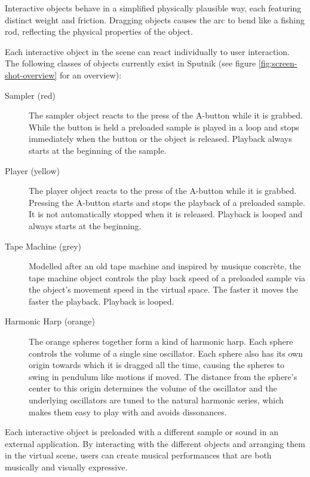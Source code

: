 \documentclass[10pt,a4paper]{scrartcl}
\begin{document}
Interactive objects behave in a simplified physically plausible way, each featuring distinct weight and friction. Dragging objects causes the arc to bend like a fishing rod, reflecting the physical properties of the object.

Each interactive object in the scene can react individually to user interaction. The following classes of objects currently exist in Sputnik (see figure \ref{fig:screen-shot-overview} for an overview):

\begin{description}
\item[Sampler (red)] The sampler object reacts to the press of the A-button while it is grabbed. While the button is held a preloaded sample is played in a loop and stops immediately when the button or the object is released. Playback always starts at the beginning of the sample.

\item[Player (yellow)] The player object reacts to the press of the A-button while it is grabbed. Pressing the A-button starts and stops the playback of a preloaded sample. It is not automatically stopped when it is released. Playback is looped and always starts at the beginning.

\item[Tape Machine (grey)] Modelled after an old tape machine and inspired by musique concrète, the tape machine object controls the play back speed of a preloaded sample via the object's movement speed in the virtual space. The faster it moves the faster the playback. Playback is looped.

\item[Harmonic Harp (orange)] The orange spheres together form a kind of harmonic harp. Each sphere controls the volume of a single sine oscillator. Each sphere also has its own origin towards which it is dragged all the time, causing the spheres to swing in pendulum like motions if moved. The distance from the sphere's center to this origin determines the volume of the oscillator and the underlying oscillators are tuned to the natural harmonic series, which makes them easy to play with and avoids dissonances.

\end{description}

Each interactive object is preloaded with a different sample or sound in an external application. By interacting with the different objects and arranging them in the virtual scene, users can create musical performances that are both musically and visually expressive.
\end{document}
